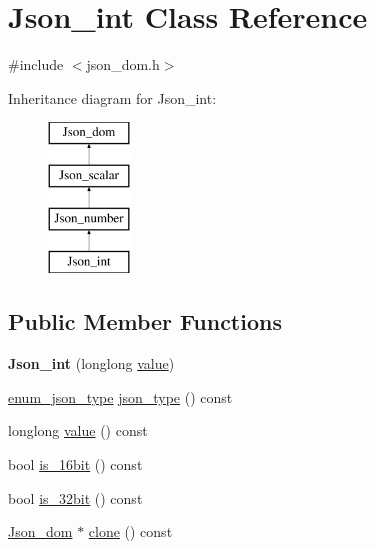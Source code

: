 \hypertarget{classJson__int}{}\section{Json\+\_\+int Class Reference}
\label{classJson__int}


{\ttfamily \#include $<$json\+\_\+dom.\+h$>$}

Inheritance diagram for Json\+\_\+int\+:\begin{figure}[H]
\begin{center}
\leavevmode
\includegraphics[height=4.000000cm]{classJson__int}
\end{center}
\end{figure}
\subsection*{Public Member Functions}
\begin{DoxyCompactItemize}
\item 
\mbox{\label{classJson__int_a3bff2d56d397006c19bffbfab2a0354c}} 
{\bfseries Json\+\_\+int} (longlong \mbox{\hyperlink{classJson__int_af5e8bf4dc1c2ba6846262e607333dbee}{value}})
\item 
\mbox{\hyperlink{classJson__dom_af37eed7dfe1da1d6507d3ab85320eb03}{enum\+\_\+json\+\_\+type}} \mbox{\hyperlink{classJson__int_a7990797f02dcd489c4fac63b0d16862e}{json\+\_\+type}} () const
\item 
longlong \mbox{\hyperlink{classJson__int_af5e8bf4dc1c2ba6846262e607333dbee}{value}} () const
\item 
bool \mbox{\hyperlink{classJson__int_a1a25d3b6bce0585b2c249d3b83fb6b85}{is\+\_\+16bit}} () const
\item 
bool \mbox{\hyperlink{classJson__int_aecb590d2898e44fcbc9c331028739abf}{is\+\_\+32bit}} () const
\item 
\mbox{\hyperlink{classJson__dom}{Json\+\_\+dom}} $\ast$ \mbox{\hyperlink{classJson__int_abfcff916299a0bd41dd18ed1596d0444}{clone}} () const
\end{DoxyCompactItemize}

